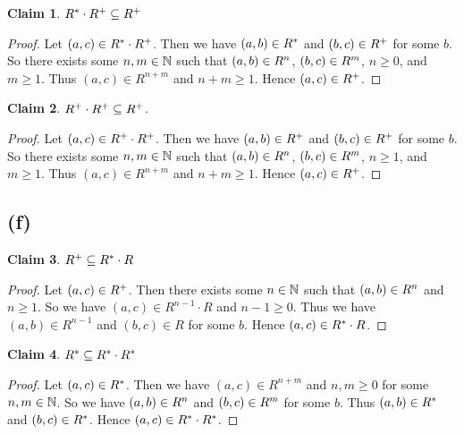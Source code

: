 \documentclass[autodetect-enginem]{article}
\theoremstyle{plain}
\theoremstyle{definition}
\theoremstyle{definition}
\newtheorem*{claim}{Claim}
\begin{document}
\begin{claim}
    $R^{*} \cdot R^{+} \subseteq R^{+}$
\end{claim}

\begin{proof}
    Let $(a,c) \in R^{*} \cdot R^{+}$.
    Then we have $(a,b) \in R^{*}$ and $(b,c) \in R^{+}$ for some $b$.
    So there exists some $n,m \in \mathbb{N}$ such that $(a,b) \in R^{n}$, $(b,c) \in R^{m}$, $n \geq 0$, and $m \geq 1$.
    Thus $(a,c) \in R^{n+m}$ and $n+m \geq 1$.
    Hence $(a,c) \in R^{+}$.
\end{proof}

\begin{claim}
    $R^{+} \cdot R^{+} \subseteq R^{+}$.
\end{claim}

\begin{proof}
    Let $(a,c) \in R^{+} \cdot R^{+}$.
    Then we have $(a,b) \in R^{+}$ and $(b,c) \in R^{+}$ for some $b$.
    So there exists some $n,m\in \mathbb{N}$ such that $(a,b) \in R^{n}$, $(b,c) \in R^{m}$,
    $n \geq 1$, and $m \geq 1$.
    Thus $(a,c) \in R^{n+m}$ and $n+m \geq 1$.
    Hence $(a,c) \in R^{+}$.
\end{proof}

\subsection*{(f)}

\begin{claim}
    $R^{+} \subseteq R^{*} \cdot R$
\end{claim}

\begin{proof}
    Let $(a,c) \in R^{+}$.
    Then there exists some $n \in \mathbb{N}$ such that $(a,b) \in R^{n}$ and $n \geq 1$.
    So we have $(a,c) \in R^{n-1} \cdot R$ and $n-1 \geq 0$.
    Thus we have $(a,b) \in R^{n-1}$ and $(b,c) \in R$ for some $b$.
    Hence $(a,c) \in R^{*} \cdot R$.
\end{proof}

\begin{claim}
    $R^{*} \subseteq R^{*} \cdot R^{*}$
\end{claim}

\begin{proof}
    Let $(a,c) \in R^{*}$.
    Then we have $(a,c) \in R^{n+m}$ and $n,m \geq 0$ for some $n,m \in \mathbb{N}$.
    So we have $(a,b) \in R^{n}$ and $(b,c) \in R^{m}$ for some $b$.
    Thus $(a,b) \in R^{*}$ and $(b,c) \in R^{*}$.
    Hence $(a,c) \in R^{*} \cdot R^{*}$.
\end{proof}
\end{document}
